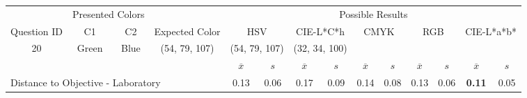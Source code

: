 %
\begin{table}[!htbp]
  \resizebox{\textwidth}{!} {
  \begin{tabular}{lccccccccccccc}
    \hline
    \multicolumn{1}{c}{}                              & \multicolumn{2}{c}{Presented Colors}             &                                                            & \multicolumn{10}{c}{Possible Results}                                                                                                                                                                                                                                                                       \\ \cline{2-3} \cline{5-14}
    \multicolumn{1}{c}{\multirow{-2}{*}{Question ID}} & C1                   & C2                        & \multirow{-2}{*}{Expected Color}                           & \multicolumn{2}{c}{HSV}                                    & \multicolumn{2}{c}{CIE-L*C*h}                              & \multicolumn{2}{c}{CMYK}                                  & \multicolumn{2}{c}{RGB}                                   & \multicolumn{2}{c}{CIE-L*a*b*}                            \\ \hline
    \multicolumn{1}{c|}{20}                           & Green                & \multicolumn{1}{c|}{Blue} & \multicolumn{1}{c|}{\cellcolor[HTML]{00FFFF}(54, 79, 107)} & \multicolumn{2}{c|}{\cellcolor[HTML]{00FFFF}(54, 79, 107)} & \multicolumn{2}{c|}{\cellcolor[HTML]{00A5FF}(32, 34, 100)} & \multicolumn{2}{c|}{\cellcolor[HTML]{008080}{\color[HTML]{FFFFFF}(12, 17, 23)}} & \multicolumn{2}{c|}{\cellcolor[HTML]{008080}{\color[HTML]{FFFFFF}(12, 17, 23)}} & \multicolumn{2}{c|}{\cellcolor[HTML]{7D93A6}{\color[HTML]{FFFFFF}(26, 28, 40)}} \\ \hline
                                                      & \multicolumn{1}{l}{} & \multicolumn{1}{l}{}      & \multicolumn{1}{l}{}                                       & $\overline{x}$           & $s$                           & $\overline{x}$           & $s$                           & $\overline{x}$          & $s$                           & $\overline{x}$          & $s$                           & $\overline{x}$           & $s$                          \\ \hline
    \multicolumn{4}{l|}{Distance to Objective - Laboratory}                                                                                                            & 0.13                  & \multicolumn{1}{c|}{0.06}          & 0.17                  & \multicolumn{1}{c|}{0.09}          & 0.14                 & \multicolumn{1}{c|}{0.08}          & 0.13                 & \multicolumn{1}{c|}{0.06}          & \textbf{0.11}         & \multicolumn{1}{c|}{0.05}         \\

\end{tabular}}
\end{table}
